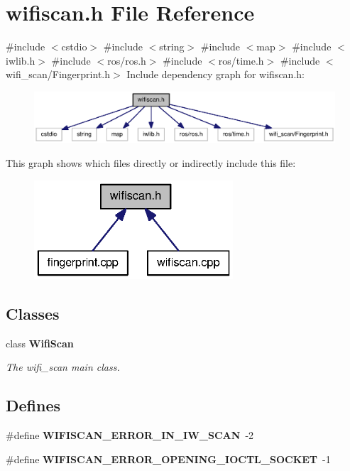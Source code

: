 \section{wifiscan.\-h \-File \-Reference}
\label{wifiscan_8h}
{\ttfamily \#include $<$cstdio$>$}\*
{\ttfamily \#include $<$string$>$}\*
{\ttfamily \#include $<$map$>$}\*
{\ttfamily \#include $<$iwlib.\-h$>$}\*
{\ttfamily \#include $<$ros/ros.\-h$>$}\*
{\ttfamily \#include $<$ros/time.\-h$>$}\*
{\ttfamily \#include $<$wifi\-\_\-scan/\-Fingerprint.\-h$>$}\*
\-Include dependency graph for wifiscan.\-h\-:\nopagebreak
\begin{figure}[H]
\begin{center}
\leavevmode
\includegraphics[width=350pt]{wifiscan_8h__incl}
\end{center}
\end{figure}
\-This graph shows which files directly or indirectly include this file\-:\nopagebreak
\begin{figure}[H]
\begin{center}
\leavevmode
\includegraphics[width=210pt]{wifiscan_8h__dep__incl}
\end{center}
\end{figure}
\subsection*{\-Classes}
\begin{DoxyCompactItemize}
\item 
class {\bf \-Wifi\-Scan}
\begin{DoxyCompactList}\small\item\em \-The wifi\-\_\-scan main class. \end{DoxyCompactList}\end{DoxyCompactItemize}
\subsection*{\-Defines}
\begin{DoxyCompactItemize}
\item 
\#define {\bf \-W\-I\-F\-I\-S\-C\-A\-N\-\_\-\-E\-R\-R\-O\-R\-\_\-\-I\-N\-\_\-\-I\-W\-\_\-\-S\-C\-A\-N}~-\/2
\item 
\#define {\bf \-W\-I\-F\-I\-S\-C\-A\-N\-\_\-\-E\-R\-R\-O\-R\-\_\-\-O\-P\-E\-N\-I\-N\-G\-\_\-\-I\-O\-C\-T\-L\-\_\-\-S\-O\-C\-K\-E\-T}~-\/1
\end{DoxyCompactItemize}


